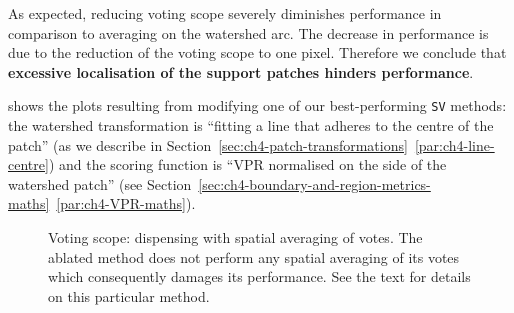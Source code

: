 As expected, reducing voting scope severely diminishes performance in comparison to averaging on the watershed arc. %
The decrease in performance is due to the reduction of the voting scope %
to one pixel. Therefore we conclude that {\bf excessive localisation of the support patches hinders performance}.

 shows the plots resulting from modifying one of our best-performing {\tt SV} methods: the watershed transformation is ``fitting a line that adheres to the centre of the patch'' (as we describe in Section~\ref*{sec:ch4-patch-transformations}~\ref{par:ch4-line-centre}) and the scoring function is ``VPR normalised on the side of the watershed patch'' (see Section~\ref*{sec:ch4-boundary-and-region-metrics-maths}~\ref{par:ch4-VPR-maths}).

\begin{figure}[t]
\centering
\caption[Voting scope: dispensing with spatial averaging of votes - plots]{Voting scope: dispensing with spatial averaging of votes. The ablated method does not perform any spatial averaging of its votes which consequently damages its performance. See the text for details on this particular method.}
\label{fig:reduced-vote-scope}
\end{figure}

